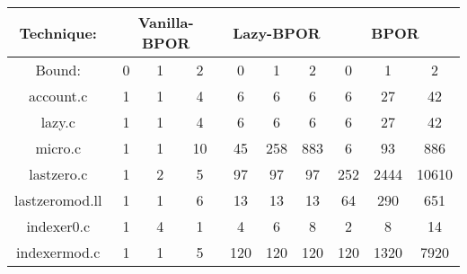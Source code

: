 \begin{center}
\begin{tabular}{ |c|c|c|c|c|c|c|c|c|c|}
\hline
\multicolumn{1}{|c|}{Technique:} & \multicolumn{3}{c|}{Vanilla-BPOR} & \multicolumn{3}{c|}{Lazy-BPOR} & \multicolumn{3}{c|}{BPOR} \\
\hline
Bound: & 0 & 1 & 2 & 0 & 1 & 2 & 0 & 1 & 2 \\
\hline \hline
account.c & 1 & 1 & 4 & 6 & 6 & 6 & 6 & 27 & 42 \\
\hline
lazy.c & 1 & 1 & 4 & 6 & 6 & 6 & 6 & 27 & 42 \\
\hline
micro.c & 1 & 1 & 10 & 45 & 258 & 883 & 6 & 93 & 886 \\
\hline
lastzero.c & 1 & 2 & 5 & 97 & 97 & 97 & 252 & 2444 & 10610 \\
\hline
lastzeromod.ll & 1 & 1 & 6 & 13 & 13 & 13 & 64 & 290 & 651 \\
\hline
indexer0.c & 1 & 4 & 1 & 4 & 6 & 8 & 2 & 8 & 14 \\
\hline
indexermod.c & 1 & 1 & 5 & 120 & 120 & 120 & 120 & 1320 & 7920 \\
\hline
\end{tabular}
\end{center}
